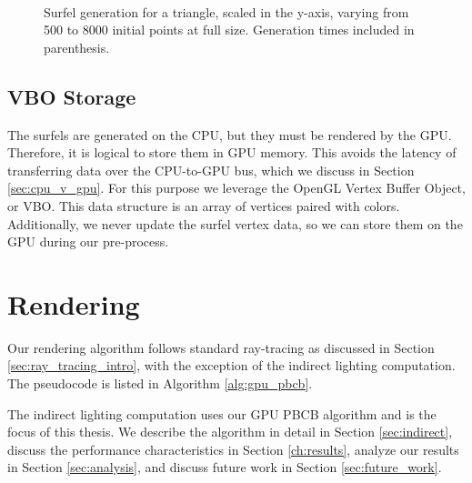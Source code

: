 \begin{figure}[h!]
   \\
   \captionfonts
   \caption[Triangle surfels at full size]{Surfel generation for a triangle, scaled in the y-axis, varying from 500 to 8000 initial points at full size. Generation times included in parenthesis.}
   \label{fig:triangle_surfels}
\end{figure}

\subsection{VBO Storage}
\label{sec:VBOStorage}

The surfels are generated on the CPU, but they must be rendered by the GPU. Therefore, it is logical to store them in GPU memory. This avoids the latency of transferring data over the CPU-to-GPU bus, which we discuss in Section \ref{sec:cpu_v_gpu}. For this purpose we leverage the OpenGL Vertex Buffer Object, or VBO. This data structure is an array of vertices paired with colors. Additionally, we never update the surfel vertex data, so we can store them on the GPU during our pre-process.

\section{Rendering}
\label{sec:rendering}
Our rendering algorithm follows standard ray-tracing as discussed in Section \ref{sec:ray_tracing_intro}, with the exception of the indirect lighting computation. The pseudocode is listed in Algorithm \ref{alg:gpu_pbcb}.

The indirect lighting computation uses our GPU PBCB algorithm and is the focus of this thesis. We describe the algorithm in detail in Section \ref{sec:indirect}, discuss the performance characteristics in Section \ref{ch:results}, analyze our results in Section \ref{sec:analysis}, and discuss future work in Section \ref{sec:future_work}.

